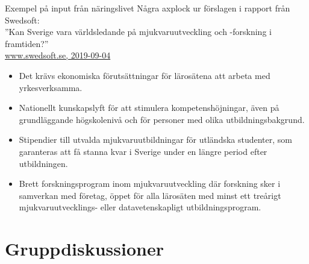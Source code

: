 \documentclass[aspectratio=169]{beamer}
\newenvironment{Slide}[1]%
  {\begin{frame}[environment=Slide]{#1}}
  {\end{frame}}%
\begin{document}
\begin{Slide}{Exempel på input från näringslivet}
  Några axplock ur förslagen i rapport från Swedsoft: \\''Kan Sverige vara världsledande på mjukvaruutveckling och -forskning i framtiden?''\\
  \href{https://www.swedsoft.se/wp-content/uploads/sites/7/2019/09/Swedsoft-Helhetssyn-p\%C3\%A5-mjukvarans-betydelse-f\%C3\%B6r-digitalisering-och-konkurrenskraft.pdf}{www.swedsoft.se, 2019-09-04}
\begin{itemize}
  \item Det krävs ekonomiska förutsättningar för lärosätena att arbeta med yrkesverksamma.
  \item Nationellt kunskapslyft för att stimulera kompetenshöjningar, även på grundläggande högskolenivå och för personer med olika utbildningsbakgrund.
  \item Stipendier till utvalda mjukvaruutbildningar för utländska studenter, som garanteras att få stanna kvar i Sverige under en längre period efter utbildningen.
  \item Brett forskningsprogram inom mjukvaruutveckling där forskning sker i samverkan med företag, öppet för alla lärosäten med minst ett treårigt mjukvaruutvecklings- eller datavetenskapligt utbildningsprogram.
  
\end{itemize}
\end{Slide}




\section{Gruppdiskussioner}
\end{document}
